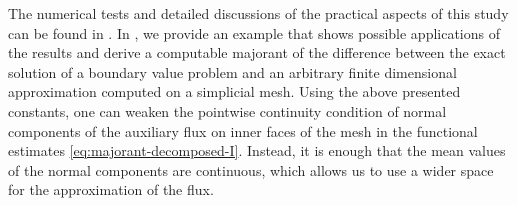 The numerical tests and detailed 
discussions of the practical aspects of this study can be found in
\cite{RefArxivMatculevichRepin2015}. In \cite[Section 5]{RefArxivMatculevichRepin2015},
we provide an example that shows possible applications of the results and derive a 
computable majorant of the difference between the exact solution of a boundary value 
problem and an arbitrary finite dimensional approximation computed on a simplicial mesh.
Using the above presented constants, one can weaken the pointwise continuity condition 
of normal components of the auxiliary flux on inner faces of the mesh in the functional 
estimates \eqref{eq:majorant-decomposed-I}. Instead, it is enough that the mean values of 
the normal components are continuous, which allows us to use a wider space for the 
approximation of the flux. 



